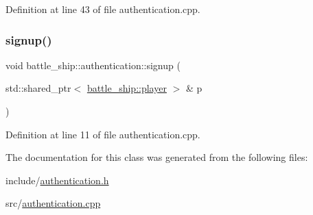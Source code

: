 Definition at line 43 of file authentication.\+cpp.

\mbox{\label{classbattle__ship_1_1authentication_a993bb7db96fad95852d23c7060ce9f06}} 
\subsubsection{\texorpdfstring{signup()}{signup()}}
{\footnotesize\ttfamily void battle\+\_\+ship\+::authentication\+::signup (\begin{DoxyParamCaption}\item[{std\+::shared\+\_\+ptr$<$ \hyperlink{classbattle__ship_1_1player}{battle\+\_\+ship\+::player} $>$ \&}]{p }\end{DoxyParamCaption})\hspace{0.3cm}{\ttfamily [static]}}



Definition at line 11 of file authentication.\+cpp.



The documentation for this class was generated from the following files\+:\begin{DoxyCompactItemize}
\item 
include/\hyperlink{authentication_8h}{authentication.\+h}\item 
src/\hyperlink{authentication_8cpp}{authentication.\+cpp}\end{DoxyCompactItemize}
